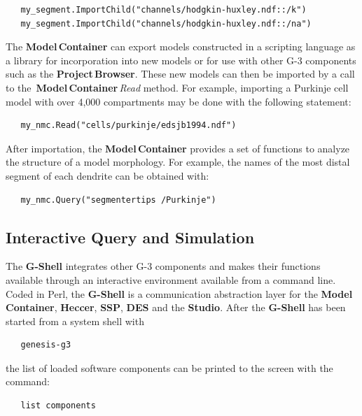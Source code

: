 \documentclass[10pt]{article}
\begin{document}
\begin{verbatim}
   my_segment.ImportChild("channels/hodgkin-huxley.ndf::/k")
   my_segment.ImportChild("channels/hodgkin-huxley.ndf::/na")
\end{verbatim}

The {\bf Model\,Container} can export models constructed in a
scripting language as a library for incorporation into new models or
for use with other G-3 components such as the {\bf Project\,Browser}.
These new models can then be imported by a call to the\,{\bf
  Model\,Container}\,{\it Read} method. For example, importing a
Purkinje cell model with over 4,000 compartments may be done with the
following statement:

\begin{verbatim}
   my_nmc.Read("cells/purkinje/edsjb1994.ndf")
\end{verbatim}

After importation, the {\bf Model\,Container} provides a set of
functions to analyze the structure of a model morphology.  For
example, the names of the most distal segment of each dendrite can be
obtained with:

\begin{verbatim}
   my_nmc.Query("segmentertips /Purkinje")
\end{verbatim}

\subsection*{Interactive Query and Simulation}

The {\bf G-Shell} integrates other
G-3 components and makes their functions available through an
interactive environment available from a command line.  Coded in Perl, the {\bf G-Shell} is a
communication abstraction layer for 
the {\bf Model\,Container}, {\bf Heccer}, {\bf SSP}, {\bf DES} and the {\bf
  Studio}.  After the {\bf G-Shell} has been started from a system
shell with
\begin{verbatim}
   genesis-g3
\end{verbatim}
the list of loaded software components can be printed to the screen with the command:

\begin{verbatim}
   list components
\end{verbatim}
\end{document}
